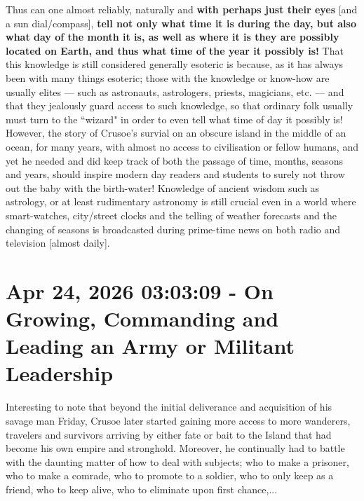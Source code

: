\documentclass[a4paper]{article}
\begin{document}
Thus can one almost reliably, naturally and \textbf{with perhaps just their eyes} [and a sun dial/compass], \textbf{tell not only what time it is during the day, but also what day of the month it is, as well as where it is they are possibly located on Earth, and thus what time of the year it possibly is!} That this knowledge is still considered generally esoteric is because, as it has always been with many things esoteric; those with the knowledge or know-how are usually elites --- such as astronauts, astrologers, priests, magicians, etc. --- and that they jealously guard access to such knowledge, so that ordinary folk usually must turn to the ``wizard" in order to even tell what time of day it possibly is! However, the story of Crusoe's survial on an obscure island in the middle of an ocean, for many years, with almost no access to civilisation or fellow humans, and yet he needed and did keep track of both the passage of time, months, seasons and years, should inspire modern day readers and students to surely not throw out the baby with the birth-water! Knowledge of ancient wisdom such as astrology, or at least rudimentary astronomy is still crucial even in a world where smart-watches, city/street clocks and the telling of weather forecasts and the changing of seasons is broadcasted during prime-time news on both radio and television [almost daily].





\section{Apr 24, 2026 03:03:09 - On Growing, Commanding and Leading an Army or Militant Leadership}
\label{SEC62}


Interesting to note that beyond the initial deliverance and acquisition of his savage man Friday, Crusoe later started gaining more access to more wanderers, travelers and survivors arriving by either fate or bait to the Island that had become his own empire and stronghold. Moreover, he continually had to battle with the daunting matter of how to deal with subjects; who to make a prisoner, who to make a comrade, who to promote to a soldier, who to only keep as a friend, who to keep alive, who to eliminate upon first chance,... 
\end{document}
